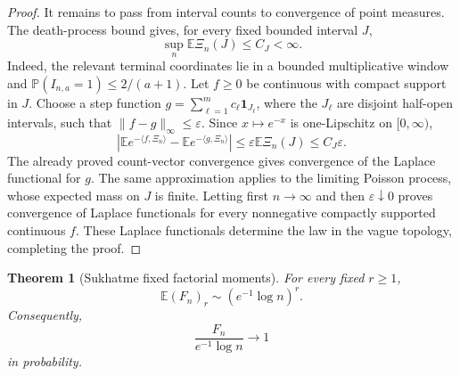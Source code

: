 \documentclass[11pt]{article}
\newtheorem{theorem}{Theorem}[section]
\theoremstyle{remark}
\newcommand{\Pp}{\mathbb P}
\newcommand{\Ee}{\mathbb E}
\newcommand{\one}{\mathbf 1}
\begin{document}
\begin{proof}
It remains to pass from interval counts to convergence of point measures.  The
death-process bound gives, for every fixed bounded interval \(J\),
\[
        \sup_n\Ee\Xi_n(J)
        \le C_J<\infty.
        \tag{7.30}
\]
Indeed, the relevant terminal coordinates lie in a bounded multiplicative
window and
\(\Pp(I_{n,a}=1)\le2/(a+1)\).  Let \(f\ge0\) be continuous with compact
support in \(J\).  Choose a step function
\(g=\sum_{\ell=1}^m c_\ell\one_{J_\ell}\), where the \(J_\ell\) are
disjoint half-open intervals, such that \(\|f-g\|_\infty\le\varepsilon\).
Since \(x\mapsto e^{-x}\) is one-Lipschitz on \([0,\infty)\),
\[
\left|
\Ee e^{-\langle f,\Xi_n\rangle}
-\Ee e^{-\langle g,\Xi_n\rangle}
\right|
\le\varepsilon\Ee\Xi_n(J)
\le C_J\varepsilon.
\tag{7.31}
\]
The already proved count-vector convergence gives convergence of the Laplace
functional for \(g\).  The same approximation applies to the limiting Poisson
process, whose expected mass on \(J\) is finite.  Letting first \(n\to\infty\)
and then \(\varepsilon\downarrow0\) proves convergence of Laplace functionals
for every nonnegative compactly supported continuous \(f\).  These Laplace
functionals determine the law in the vague topology, completing the proof.
\end{proof}

\begin{theorem}[Sukhatme fixed factorial moments]\label{thm:suk-fact}
For every fixed \(r\ge1\),
\[
        \Ee(F_n)_r\sim (e^{-1}\log n)^r.
\]
Consequently,
\[
        \frac{F_n}{e^{-1}\log n}\to1
\]
in probability.
\end{theorem}
\end{document}
